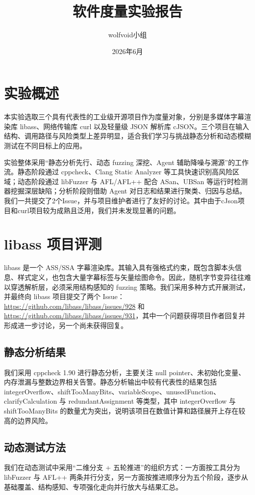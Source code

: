 \documentclass[UTF8,a4paper,zihao=-4]{ctexart}
\title{软件度量实验报告}
\author{wolfvoid小组}
\date{2026年6月}
\begin{document}
\maketitle
\thispagestyle{empty}

\section{实验概述}
本实验选取三个具有代表性的工业级开源项目作为度量对象，分别是多媒体字幕渲染库 libass、网络传输库 curl 以及轻量级 JSON 解析库 cJSON。三个项目在输入结构、调用路径与风险类型上差异明显，适合我们学习与挑战静态分析和动态模糊测试在不同目标上的应用。

实验整体采用“静态分析先行、动态 fuzzing 深挖、Agent 辅助降噪与溯源”的工作流。静态阶段通过 cppcheck、Clang Static Analyzer 等工具快速识别高风险区域；动态阶段通过 libFuzzer 与 AFL/AFL++ 配合 ASan、UBSan 等运行时检测器挖掘深层缺陷；分析阶段则借助 Agent 对日志和结果进行聚类、归因与总结。我们一共提交了2个Issue，并与项目维护者进行了友好的讨论。其中由于cJson项目和curl项目较为成熟且泛用，我们并未发现显著的问题。

\section{libass 项目评测}
libass 是一个 ASS/SSA 字幕渲染库。其输入具有强格式约束，既包含脚本头信息、样式定义，也包含大量字幕标签与矢量绘图命令。因此，随机字节变异往往难以穿透解析层，必须采用结构感知的 fuzzing 策略。我们采用多种方式开展测试，并最终向 libass 项目提交了两个 Issue：\url{https://github.com/libass/libass/issues/928} 和 \url{https://github.com/libass/libass/issues/931}，其中一个问题获得项目作者回复并形成进一步讨论，另一个尚未获得回复。

\subsection{静态分析结果}
我们采用 cppcheck 1.90 进行静态分析，主要关注 null pointer、未初始化变量、内存泄漏与整数边界相关告警。静态分析输出中较有代表性的结果包括 integerOverflow、shiftTooManyBits、variableScope、unusedFunction、clarifyCalculation 与 redundantAssignment 等类型，其中 integerOverflow 与 shiftTooManyBits 的数量尤为突出，说明该项目在数值计算和路径展开上存在较高的边界风险。

\subsection{动态测试方法}
我们在动态测试中采用“二维分支 + 五轮推进”的组织方式：一方面按工具分为 libFuzzer 与 AFL++ 两条并行分支，另一方面按推进顺序分为五个阶段，逐步从基础覆盖、结构感知、专项强化走向并行放大与结果汇总。
\end{document}
